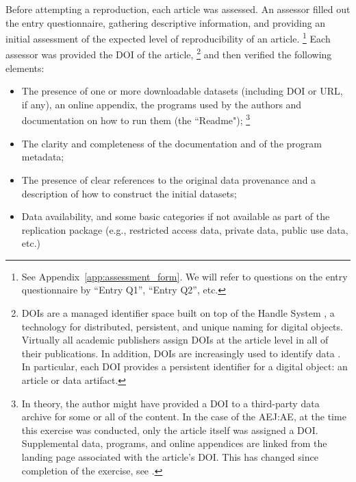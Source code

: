 Before attempting a reproduction, each article was assessed.
An assessor filled out the entry questionnaire, gathering descriptive information,  and providing an initial assessment of the expected level of reproducibility of an article.%
%
\footnote{See Appendix~\ref{app:assessment_form}. We will refer to questions on the entry questionnaire by ``Entry Q1'', ``Entry Q2'', etc.}
%
Each assessor was provided the  \ac{DOI} of the article,%
%
\footnote{\acp{DOI} are a managed identifier space built on top of the Handle System \parencite{Handle}, a technology for distributed, persistent, and unique naming for digital objects. Virtually all academic publishers assign \acp{DOI} at the article level in all of their publications. In addition, \acp{DOI} are increasingly used to identify data \parencite{PollardWilkinson2010}. In particular, each \ac{DOI} provides a persistent identifier \parencite{DOI2012} for a digital object: an article or data artifact.}
%
and then verified the following elements:
\begin{itemize}
\item
The presence of one or more downloadable datasets (including \ac{DOI} or URL, if any), an online appendix, the programs used by the authors and documentation on how to run them (the ``Readme");%
%
 \footnote{In theory, the author might have provided a \ac{DOI} to a third-party data archive for some or all of the content. 
 	In the case of the \ac{AEJ:AE}, at the time this exercise was conducted, only the article itself was assigned a \ac{DOI}. Supplemental data, programs, and online appendices are linked from the landing page associated with the article's \ac{DOI}. This has changed since completion of the exercise, see \textcite{VilhuberAEAPap.Proc.2020}.}
 \item
 The clarity and completeness of the documentation and of the program metadata;
 \item
 The presence of clear references to the original data provenance and a description of how to construct the initial datasets;
 \item
 Data availability, and some basic categories if not available as part of the replication package (e.g., restricted access data, private data, public use data, etc.)
 \end{itemize}

